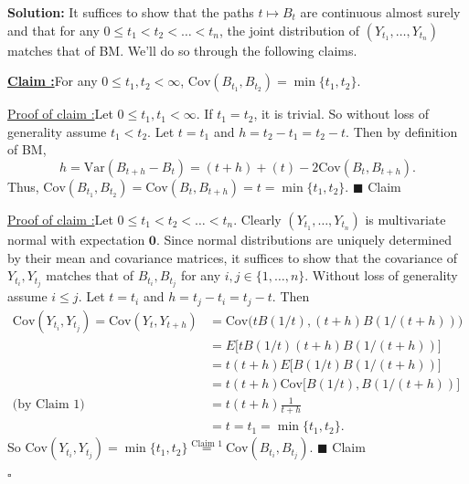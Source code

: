 \documentclass[12pt]{article}
\newcounter{ProofCounter}
\newcounter{ClaimCounter}[ProofCounter]
\newenvironment{Solution}{\stepcounter{ProofCounter}\textbf{Solution:}}{\hfill$\square$}
\newenvironment{claim}[1]{\vspace{1mm}\stepcounter{ClaimCounter}\par\noindent\underline{\bf Claim \theClaimCounter:}\space#1}{}
\newenvironment{claimproof}[1]{\par\noindent\underline{Proof of claim \theClaimCounter:}\space#1}{\hfill $\blacksquare$ Claim \theClaimCounter}
\begin{document}
\begin{Solution}
  It suffices to show that the paths $t \mapsto B_t$ are continuous almost surely and that for any $0 \leq t_1 < t_2 < \dots < t_n$, the joint distribution of $(Y_{t_1}, \dots, Y_{t_n})$ matches that of BM. We'll do so through the following claims.

  \begin{claim}
    For any $0 \leq t_1, t_2 < \infty$, $\text{Cov}(B_{t_1}, B_{t_2}) = \min\{t_1, t_2\}$.
  \end{claim}
  \begin{claimproof}
    Let $0 \leq t_1, t_1 < \infty$. If $t_1 = t_2$, it is trivial. So without loss of generality assume $t_1 < t_2$. Let $t = t_1$ and $h = t_2 - t_1 = t_2 - t$. Then by definition of BM,
    \[
      h = \text{Var}(B_{t+h} - B_t) = (t + h) + (t) - 2\text{Cov}(B_t, B_{t+h}).
    \]
    Thus, $\text{Cov}(B_{t_1}, B_{t_2}) = \text{Cov}(B_t, B_{t+h}) = t = \min\{t_1, t_2\}$.
  \end{claimproof}

  \begin{claimproof}
    Let $0 \leq t_1 < t_2 < \dots < t_n$. Clearly $(Y_{t_1}, \dots, Y_{t_n})$ is multivariate normal with expectation $\bm{0}$. Since normal distributions are uniquely determined by their mean and covariance matrices, it suffices to show that the covariance of $Y_{t_i}, Y_{t_j}$ matches that of $B_{t_i}, B_{t_j}$ for any $i, j \in \{1, \dots, n\}$. Without loss of generality assume $i \leq j$. Let $t = t_i$ and $h = t_j - t_i = t_j - t$. Then
    \begin{align*}
      \text{Cov}(Y_{t_i}, Y_{t_j}) = \text{Cov}(Y_t, Y_{t+h}) & = \text{Cov}\bigg(tB(1/t), (t+h)B(1/(t+h))\bigg) \\
      & = E\bigg[tB(1/t)(t+h)B(1/(t+h))\bigg] \\
      & = t(t+h) E\bigg[ B(1/t)B(1/(t+h)) \bigg] \\
      & = t(t+h) \text{Cov}\bigg[ B(1/t),B(1/(t+h)) \bigg] \\
      \text{(by Claim 1)} \ \ \ \ & = t(t+h)\frac{1}{t+h} \\
      & = t = t_1 = \min\{t_1, t_2\}.
    \end{align*}
    So $\text{Cov}(Y_{t_i}, Y_{t_j}) = \min\{t_1, t_2\} \stackrel{\text{Claim 1}}{=} \text{Cov}(B_{t_i}, B_{t_j})$.
  \end{claimproof}


\end{Solution}
\end{document}
